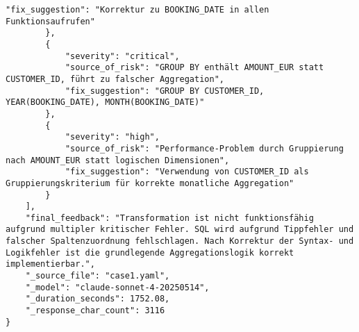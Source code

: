 \begin{lstlisting}[caption={Ausgabe: Claude Sonnet 4 Anwendungsfall 1 Konsistenzdurchlauf},label={claude_case1_prompt2}]
            "fix_suggestion": "Korrektur zu BOOKING_DATE in allen Funktionsaufrufen"
        },
        {
            "severity": "critical",
            "source_of_risk": "GROUP BY enthält AMOUNT_EUR statt CUSTOMER_ID, führt zu falscher Aggregation",
            "fix_suggestion": "GROUP BY CUSTOMER_ID, YEAR(BOOKING_DATE), MONTH(BOOKING_DATE)"
        },
        {
            "severity": "high",
            "source_of_risk": "Performance-Problem durch Gruppierung nach AMOUNT_EUR statt logischen Dimensionen",
            "fix_suggestion": "Verwendung von CUSTOMER_ID als Gruppierungskriterium für korrekte monatliche Aggregation"
        }
    ],
    "final_feedback": "Transformation ist nicht funktionsfähig aufgrund multipler kritischer Fehler. SQL wird aufgrund Tippfehler und falscher Spaltenzuordnung fehlschlagen. Nach Korrektur der Syntax- und Logikfehler ist die grundlegende Aggregationslogik korrekt implementierbar.",
    "_source_file": "case1.yaml",
    "_model": "claude-sonnet-4-20250514",
    "_duration_seconds": 1752.08,
    "_response_char_count": 3116
}
\end{lstlisting}

